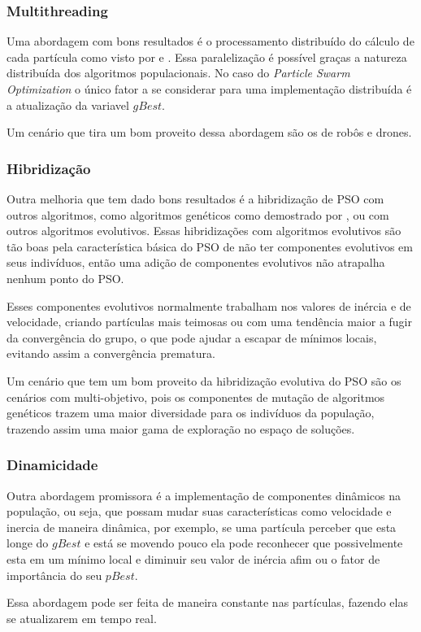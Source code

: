         \subsubsection{Multithreading}
            Uma abordagem com bons resultados é o processamento distribuído do cálculo de cada partícula como visto por \cite{Thongkrairat2019} e \cite{Kim2011}. Essa paralelização é possível graças a natureza distribuída dos algoritmos populacionais. No caso do \textit{Particle Swarm Optimization} o único fator a se considerar para uma implementação distribuída é a atualização da variavel $gBest$.\newline
            
            Um cenário que tira um bom proveito dessa abordagem são os de robôs e drones.            

        \subsubsection{Hibridização}
            Outra melhoria que tem dado bons resultados é a hibridização de PSO com outros algoritmos, como algoritmos genéticos como demostrado por \cite{carvalho2014}, ou com outros algoritmos evolutivos.\newline
            Essas hibridizações com algoritmos evolutivos são tão boas pela característica básica do PSO de não ter componentes evolutivos em seus indivíduos, então uma adição de componentes evolutivos não atrapalha nenhum ponto do PSO.\newline
            
            Esses componentes evolutivos normalmente trabalham nos valores de inércia e de velocidade, criando partículas mais teimosas ou com uma tendência maior a fugir da convergência do grupo, o que pode ajudar a escapar de mínimos locais, evitando assim a convergência prematura.\newline
            
            Um cenário que tem um bom proveito da hibridização evolutiva do PSO são os cenários com multi-objetivo, pois os componentes de mutação de algoritmos genéticos trazem uma maior diversidade para os indivíduos da população, trazendo assim uma maior gama de exploração no espaço de soluções.

        \subsubsection{Dinamicidade}
            Outra abordagem promissora é a implementação de componentes dinâmicos na população, ou seja, que possam mudar suas características como velocidade e inercia de maneira dinâmica, por exemplo, se uma partícula perceber que esta longe do $gBest$ e está se movendo pouco ela pode reconhecer que possivelmente esta em um mínimo local e diminuir seu valor de inércia afim ou o fator de importância do seu $pBest$.\newline
            
            Essa abordagem pode ser feita de maneira constante nas partículas, fazendo elas se atualizarem em tempo real.


